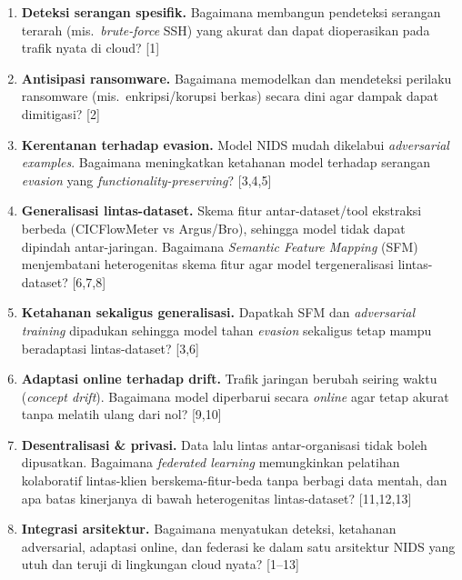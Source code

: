 \documentclass[11pt,a4paper]{article}
\begin{document}
\begin{enumerate}[label=\textbf{RM\arabic*.},leftmargin=3.2em]
  \item \textbf{Deteksi serangan spesifik.} Bagaimana membangun pendeteksi
  serangan terarah (mis.\ \emph{brute-force} SSH) yang akurat dan dapat
  dioperasikan pada trafik nyata di cloud? [1]

  \item \textbf{Antisipasi ransomware.} Bagaimana memodelkan dan mendeteksi
  perilaku ransomware (mis.\ enkripsi/korupsi berkas) secara dini agar dampak
  dapat dimitigasi? [2]

  \item \textbf{Kerentanan terhadap evasion.} Model NIDS mudah dikelabui
  \emph{adversarial examples}. Bagaimana meningkatkan ketahanan model terhadap
  serangan \emph{evasion} yang \emph{functionality-preserving}? [3,4,5]

  \item \textbf{Generalisasi lintas-dataset.} Skema fitur antar-dataset/tool
  ekstraksi berbeda (CICFlowMeter vs Argus/Bro), sehingga model tidak dapat
  dipindah antar-jaringan. Bagaimana \emph{Semantic Feature Mapping} (SFM)
  menjembatani heterogenitas skema fitur agar model tergeneralisasi
  lintas-dataset? [6,7,8]

  \item \textbf{Ketahanan sekaligus generalisasi.} Dapatkah SFM dan
  \emph{adversarial training} dipadukan sehingga model tahan \emph{evasion}
  sekaligus tetap mampu beradaptasi lintas-dataset? [3,6]

  \item \textbf{Adaptasi online terhadap drift.} Trafik jaringan berubah
  seiring waktu (\emph{concept drift}). Bagaimana model diperbarui secara
  \emph{online} agar tetap akurat tanpa melatih ulang dari nol? [9,10]

  \item \textbf{Desentralisasi \& privasi.} Data lalu lintas antar-organisasi
  tidak boleh dipusatkan. Bagaimana \emph{federated learning} memungkinkan
  pelatihan kolaboratif lintas-klien berskema-fitur-beda tanpa berbagi data
  mentah, dan apa batas kinerjanya di bawah heterogenitas lintas-dataset?
  [11,12,13]

  \item \textbf{Integrasi arsitektur.} Bagaimana menyatukan deteksi,
  ketahanan adversarial, adaptasi online, dan federasi ke dalam satu arsitektur
  NIDS yang utuh dan teruji di lingkungan cloud nyata? [1--13]
\end{enumerate}
\end{document}
